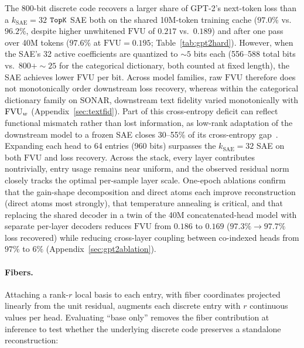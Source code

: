 The 800-bit discrete code recovers a larger share of GPT-2's next-token loss
than a $k_{\mathrm{SAE}}{=}32$ $\mathop{\mathtt{TopK}}\limits$ SAE both on the shared 10M-token
training cache ($97.0\%$ vs.\ $96.2\%$, despite higher unwhitened
$\mathrm{FVU}$ of $0.217$ vs.\ $0.189$) and after one pass over 40M tokens
($97.6\%$ at $\mathrm{FVU} = 0.195$; Table~\ref{tab:gpt2hard}). However,
when the SAE's 32 active coefficients are quantized to ${\sim}5$ bits each
(556--588 total bits vs.\ $800 + {\sim}25$ for the categorical
dictionary, both counted at fixed length), the SAE achieves lower
$\mathrm{FVU}$ per bit. Across model
families, raw $\mathrm{FVU}$ therefore does not monotonically order
downstream loss recovery, whereas within the categorical dictionary family
on SONAR, downstream text fidelity varied monotonically with $\mathrm{FVU}_w$
(Appendix~\ref{sec:textfid}). Part of this cross-entropy deficit can
reflect functional mismatch rather than lost information, as low-rank
adaptation of the downstream model to a frozen SAE closes 30--55\% of its
cross-entropy gap~\cite{chen2025lowrankadaptingmodelssparse}. Expanding
each head to 64 entries (960 bits) surpasses the $k_{\mathrm{SAE}}{=}32$
SAE on both $\mathrm{FVU}$ and loss recovery. Across the stack, every
layer contributes nontrivially, entry usage remains near uniform, and the
observed residual norm closely tracks the optimal per-sample layer scale.
One-epoch ablations confirm that the gain-shape decomposition and direct
atoms each improve
reconstruction (direct atoms most strongly), that temperature annealing is
critical, and that replacing the shared decoder in a twin of the 40M
concatenated-head model with separate per-layer decoders reduces $\mathrm{FVU}$ from $0.186$
to $0.169$ ($97.3\% \to 97.7\%$ loss recovered) while reducing cross-layer
coupling between co-indexed heads from $97\%$ to $6\%$
(Appendix~\ref{sec:gpt2ablation}).

\paragraph{Fibers.} Attaching a rank-$r$ local basis to each entry, with
fiber coordinates projected linearly from the unit residual, augments each
discrete entry with $r$ continuous values per head. Evaluating ``base only''
removes the fiber contribution at inference to test whether the underlying
discrete code preserves a standalone reconstruction:

